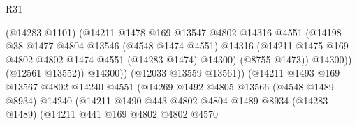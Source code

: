 \begin{lexlean}{R31}
\begin{coremodule}
                                        (@14283 @1101)
                                        (@14211
                                          @1478
                                          @169
                                          @13547
                                          @4802
                                          @14316
                                          @4551
                                          (@14198
                                            @38
                                            @1477
                                            @4804
                                            @13546
                                            (@4548 @1474 @4551)
                                            @14316
                                            (@14211
                                              @1475
                                              @169
                                              @4802
                                              @4802
                                              @1474
                                              @4551
                                              (@14283 @1474)
                                              @14300)
                                            (@8755 @1473))
                                          @14300))
                                      (@12561 @13552))
                                    @14300))
                                (@12033 @13559 @13561))
                              (@14211
                                @1493
                                @169
                                @13567
                                @4802
                                @14240
                                @4551
                                (@14269
                                  @1492
                                  @4805
                                  @13566
                                  (@4548 @1489 @8934)
                                  @14240
                                  (@14211
                                    @1490
                                    @443
                                    @4802
                                    @4804
                                    @1489
                                    @8934
                                    (@14283 @1489)
                                    (@14211
                                      @441
                                      @169
                                      @4802
                                      @4802
                                      @4570

\end{coremodule}
\end{lexlean}
